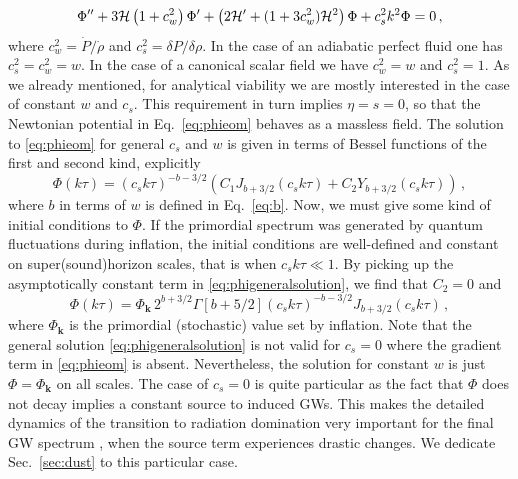 \documentclass[a4paper,11pt]{article}
\numberwithin{equation}{section}
\begin{document}
\begin{equation}
\Phi''+3{\cal H}\left(1+c_w^2\right)\Phi'+\left(2{\cal H}'+(1+3c_w^2){\cal H}^2\right)\Phi+c_s^2k^2\Phi=0\,,
\end{equation}
where $c_w^2=\dot P/\dot \rho$ and $c_s^2=\delta P/\delta\rho$. In the case of an adiabatic perfect fluid one has $c_s^2=c_w^2=w$. In the case of a canonical scalar field we have $c_w^2=w$ and $c_s^2=1$. As we already mentioned, for analytical viability we are mostly interested in the case of constant $w$ and $c_s$. This requirement in turn implies $\eta=s=0$, so that the Newtonian potential in Eq.~\eqref{eq:phieom} behaves as a massless field. The solution to \eqref{eq:phieom} for general $c_s$ and $w$ is given in terms of Bessel functions of the first and second kind, explicitly
\begin{equation}\label{eq:phigeneralsolution}
\Phi(k\tau)=(c_sk\tau)^{-b-3/2}\left(C_1 J_{b+3/2}(c_sk\tau)+C_2 Y_{b+3/2}(c_sk\tau)\right)\,,
\end{equation}
where $b$ in terms of $w$ is defined in Eq.~\eqref{eq:b}. Now, we must give some kind of initial conditions to $\Phi$. If the primordial spectrum was generated by quantum fluctuations during inflation, the initial conditions are well-defined and constant on super(sound)horizon scales, that is when $c_sk\tau\ll1$. By picking up the asymptotically constant term in \eqref{eq:phigeneralsolution}, we find that $C_2=0$ and
\begin{equation}\label{eq:phisolsol}
\Phi(k\tau)=\Phi_{\mathbf{k}}\,2^{b+3/2}\Gamma[b+5/2](c_sk\tau)^{-b-3/2}J_{b+3/2}(c_sk\tau)\,,
\end{equation}
where $\Phi_{\mathbf{k}}$ is the primordial (stochastic) value set by inflation. Note that the general solution \eqref{eq:phigeneralsolution} is not valid for $c_s=0$ where the gradient term in \eqref{eq:phieom} is absent. Nevertheless, the solution for constant $w$ is just $\Phi=\Phi_{\mathbf{k}}$ on all scales. The case of $c_s=0$ is quite particular as the fact that $\Phi$ does not decay implies a constant source to induced GWs. This makes the detailed dynamics of the transition to radiation domination very important for the final GW spectrum \cite{Inomata:2019zqy,Inomata:2019ivs}, when the source term experiences drastic changes. We dedicate Sec.~\ref{sec:dust} to this particular case. 
\end{document}

